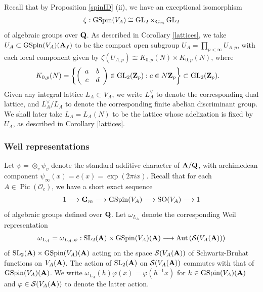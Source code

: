\documentclass{amsart}
\theoremstyle{definition}
\begin{document}
Recall that by Proposition \ref{spinID} (ii), we have an exceptional isomorphism 
\begin{align}\label{accidentV_A} \zeta: \operatorname{GSpin}(V_A) \cong  \operatorname{GL}_2 \times_{{\bf{G}}_m} \operatorname{GL}_2 \end{align} 
of algebraic groups over ${\bf{Q}}$. As described in Corollary \ref{lattices}, 
we take $U_A \subset \operatorname{GSpin}(V_A)({\bf{A}}_f)$ to be the compact open subgroup  
$U_A = \prod_{p < \infty} U_{A, p}$, with each local component given by $\zeta(U_{A, p}) \cong K_{0, p}(N) \times K_{0, p}(N)$, where
\begin{align}\label{level} K_{0, p}(N) &= \left\lbrace \left( \begin{array}{cc} a & b \\ c & d \end{array} \right) \in \operatorname{GL}_2({\bf{Z}}_p) 
: c \in N {\bf{Z}}_p \right\rbrace \subset \operatorname{GL}_2({\bf{Z}}_p). \end{align}
Given any integral lattice $L_A \subset V_A$, we write $L_A^{\vee}$ to denote the corresponding dual lattice, 
and $L_A^{\vee}/L_A$ to denote the corresponding finite abelian discriminant group. We shall later 
take $L_A = L_A(N)$ to be the lattice whose adelization is fixed by $U_A$, as described in Corollary \ref{lattices}.

\subsubsection{Weil representations} 

Let $\psi = \otimes_v \psi_{v}$ denote the standard additive character of ${\bf{A}}/{\bf{Q}}$, with archimedean component $\psi_{\infty}(x) = e(x)= \exp(2 \pi i x)$. 
Recall that for each $A \in \operatorname{Pic}(\mathcal{O}_c)$, we have a short exact sequence
\begin{align*} 1 \longrightarrow {\bf{G}}_m \longrightarrow \operatorname{GSpin}(V_A) \longrightarrow \operatorname{SO}(V_A) \longrightarrow 1\end{align*}
of algebraic groups defined over ${\bf{Q}}$. Let $\omega_{L_A}$ denote the corresponding Weil representation
\begin{align*} \omega_{L_A} = \omega_{L_A, \psi}: \operatorname{SL}_2({\bf{A}})  \times \operatorname{GSpin}(V_A)({\bf{A}}) 
\longrightarrow \operatorname{Aut} \left(  \mathcal{S}(V_A({\bf{A}})) \right) \end{align*}
of $\operatorname{SL}_2({\bf{A}}) \times \operatorname{GSpin}(V_A)({\bf{A}}) $ acting on the space $\mathcal{S}(V_A({\bf{A}}))$
of Schwartz-Bruhat functions on $V_A({\bf{A}})$. 
The action of $\operatorname{SL}_2({\bf{A}})$ on $\mathcal{S}(V_A({\bf{A}}))$ commutes with that of $\operatorname{GSpin}(V_A)({\bf{A}})$.
We write $\omega_{L_A}(h) \varphi (x) = \varphi(h^{-1} x)$ for $h \in \operatorname{GSpin}(V_A)({\bf{A}})$ and $\varphi \in \mathcal{S}(V_A({\bf{A}}))$ to denote the latter action. 
\end{document}
